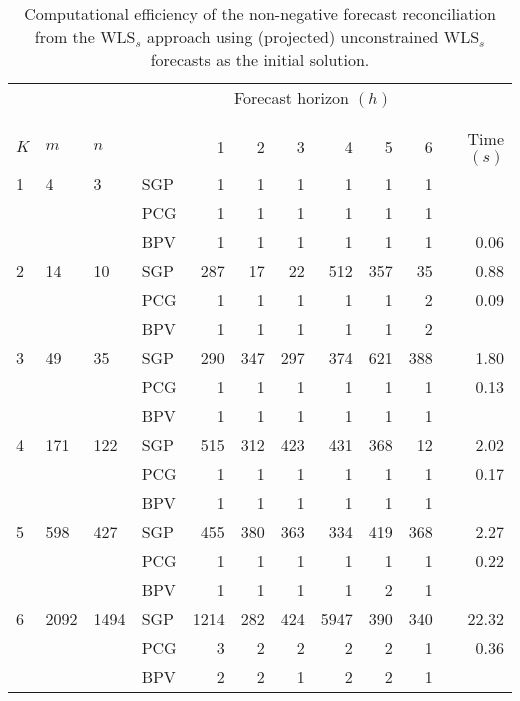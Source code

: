 \documentclass[twocolumn]{svjour3}
\begin{document}
\begin{table*}[ht]
	\small
	\tabcolsep=0.20cm
	\captionsetup{belowskip=0pt, aboveskip=4pt}
	\caption{Computational efficiency of the non-negative forecast reconciliation from the WLS$_{s}$ approach using (projected) unconstrained WLS$_{s}$ forecasts as the initial solution.}
	\label{tbl:perfnnwlsp}
	\centering
	\begin{threeparttable}
		\begin{tabular}{llllrrrrrrr}
			\toprule
			& & & & \multicolumn{6}{c}{Forecast horizon $(h)$} \\[-0.4cm]\\\cline{5-10}\\[-0.3cm]
			$K$ & $m$ & $n$ & & 1 & 2 & 3 & 4 & 5 & 6 & Time $(s)$ \\
			\midrule
			1 & 4 & 3 & SGP & 1 & 1 & 1 & 1 & 1 & 1 & \bm{$0.03$} \\
			& & & PCG & 1 & 1 & 1 & 1 & 1 & 1 & \bm{$0.03$} \\
			& & & BPV & 1 & 1 & 1 & 1 & 1 & 1 & 0.06 \\
			\midrule
			2 & 14 & 10 & SGP & 287 & 17 & 22 & 512 & 357 & 35 & 0.88 \\
			& & & PCG & 1 & 1 & 1 & 1 & 1 & 2 & 0.09 \\
			& & & BPV & 1 & 1 & 1 & 1 & 1 & 2 & \bm{$0.08$} \\
			\midrule
			3 & 49 & 35 & SGP & 290 & 347 & 297 & 374 & 621 & 388 & 1.80 \\
			& & & PCG & 1 & 1 & 1 & 1 & 1 & 1 & 0.13 \\
			& & & BPV & 1 & 1 & 1 & 1 & 1 & 1 & \bm{$0.07$} \\
			\midrule
			4 & 171 & 122 & SGP & 515 & 312 & 423 & 431 & 368 & 12 & 2.02 \\
			& & & PCG & 1 & 1 & 1 & 1 & 1 & 1 & 0.17 \\
			& & & BPV & 1 & 1 & 1 & 1 & 1 & 1 & \bm{$0.09$} \\
			\midrule
			5 & 598 & 427 & SGP & 455 & 380 & 363 & 334 & 419 & 368 & 2.27 \\
			& & & PCG & 1 & 1 & 1 & 1 & 1 & 1 & 0.22 \\
			& & & BPV & 1 & 1 & 1 & 1 & 2 & 1 & \bm{$0.12$} \\
			\midrule
			6 & 2092 & 1494 & SGP & 1214 & 282 & 424 & 5947 & 390 & 340 & 22.32 \\
			& & & PCG & 3 & 2 & 2 & 2 & 2 & 1 & 0.36 \\
			& & & BPV & 2 & 2 & 1 & 2 & 2 & 1 & \bm{$0.17$} \\

\end{tabular}
\end{threeparttable}
\end{table*}
\end{document}
